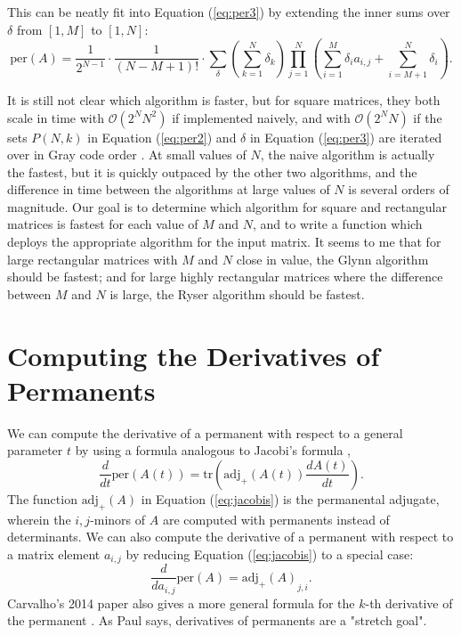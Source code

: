 \documentclass{article}
\begin{document}
This can be neatly fit into Equation (\ref{eq:per3}) by extending the inner sums over $\delta$ from
$\left[1,M\right]$ to $\left[1,N\right]$:
\begin{equation} \label{eq:rectper3}
    \text{per}(A) = \frac{1}{2^{N-1}} \cdot \frac{1}{\left(N - M + 1\right)!} \cdot \sum_{\delta}{
        \left(\sum_{k=1}^N{\delta_k}\right)
        \prod_{j=1}^N{\left(\sum_{i=1}^M{\delta_i a_{i,j}} + \sum_{i=M+1}^N{\delta_i}\right)}
    }.
\end{equation}

It is still not clear which algorithm is faster, but for square matrices, they both scale in time
with $\mathcal{O}(2^N N^2)$ if implemented naively, and with $\mathcal{O}(2^N N)$ if the sets
$P(N,k)$ in Equation (\ref{eq:per2}) and $\delta$ in Equation (\ref{eq:per3}) are iterated over in
Gray code order \cite{wiki:computing,knuth2005}.  At small values of $N$, the naive algorithm is
actually the fastest, but it is quickly outpaced by the other two algorithms, and the difference in
time between the algorithms at large values of $N$ is several orders of magnitude. Our goal is to
determine which algorithm for square and rectangular matrices is fastest for each value of $M$ and
$N$, and to write a function which deploys the appropriate algorithm for the input matrix.  It seems
to me that for large rectangular matrices with $M$ and $N$ close in value, the Glynn algorithm
should be fastest; and for large highly rectangular matrices where the difference between $M$ and
$N$ is large, the Ryser algorithm should be fastest.

\section*{Computing the Derivatives of Permanents}

We can compute the derivative of a permanent with respect to a general parameter $t$ by using
a formula analogous to Jacobi's formula \cite{carvalho2014},
\begin{equation} \label{eq:jacobis}
    \frac{d}{dt}\text{per}(A(t)) = \text{tr}\left(\text{adj}_{+}(A(t))\frac{dA(t)}{dt}\right).
\end{equation}
The function $\text{adj}_{+}(A)$ in Equation (\ref{eq:jacobis}) is the permanental adjugate, wherein
the $i,j$-minors of $A$ are computed with permanents instead of determinants. We can also compute
the derivative of a permanent with respect to a matrix element $a_{i,j}$ by reducing Equation
(\ref{eq:jacobis}) to a special case:
\begin{equation}
    \frac{d}{d{a_{i,j}}}\text{per}(A) = {\text{adj}_{+}(A)}_{j,i}.
\end{equation}
Carvalho's 2014 paper also gives a more general formula for the $k$-th derivative of the
permanent \cite{carvalho2014}. As Paul says, derivatives of permanents are a "stretch goal".
\end{document}
